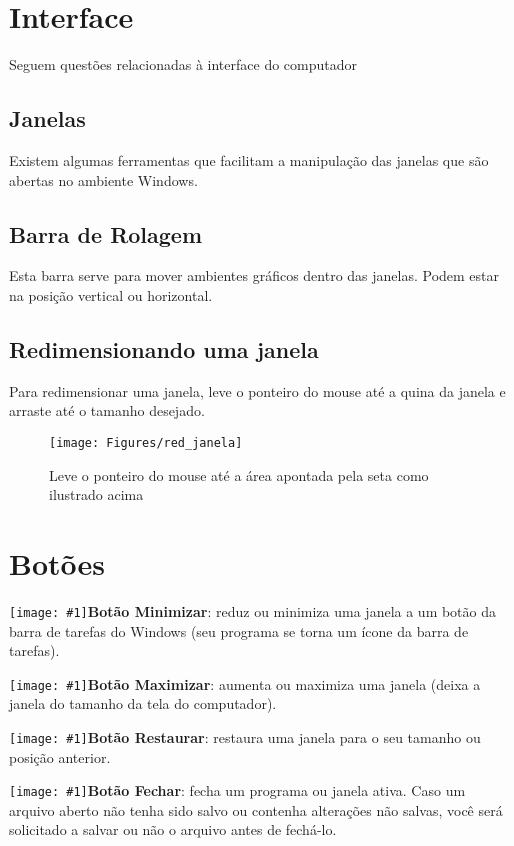 \documentclass[hidelinks,12pt]{article}
\newcommand{\icon}[1]{\texttt{[image: \#1]}}
\begin{document}
	\section{Interface}
	Seguem questões relacionadas à interface do computador

	\subsection{Janelas}
	Existem algumas ferramentas que facilitam a manipulação das janelas que são abertas no ambiente Windows.

	\subsection{Barra de Rolagem}
	Esta barra serve para mover ambientes gráficos dentro das janelas. Podem estar na posição vertical ou horizontal.

	\subsection{Redimensionando uma janela}
	Para redimensionar uma janela, leve o ponteiro do mouse até a quina da janela e arraste até o tamanho desejado.

	\begin{figure}[!h]
		\centering
		\texttt{[image: Figures/red\_janela]}
		\caption{Leve o ponteiro do mouse até a área apontada pela seta como ilustrado acima}
		\label{fig:redimensionando janela}

	\end{figure}


	\section{Botões}


	\noindent \icon{Figures/minimizar}{\bf Botão Minimizar}: reduz ou minimiza uma janela a um botão da barra de tarefas do Windows (seu programa se torna um ícone da barra de tarefas).

	\noindent\icon{Figures/maximizar}{\bf Botão Maximizar}: aumenta ou maximiza uma janela (deixa a janela do tamanho da tela do computador).

	\noindent\icon{Figures/restaurar}{\bf Botão Restaurar}: restaura uma janela para o seu tamanho ou posição anterior.

	\noindent\icon{Figures/fechar}{\bf Botão Fechar}: fecha um programa ou janela ativa. Caso um arquivo aberto não tenha sido salvo ou contenha alterações não salvas, você será solicitado a salvar ou não o arquivo antes de fechá-lo.
\end{document}

